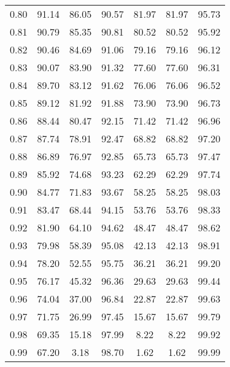 \begin{tabular}{|c|c|c|c|c|c|c|}
      0.80 &     91.14 &     86.05 &      90.57 &   81.97 &      81.97 &         95.73 \\
      0.81 &     90.79 &     85.35 &      90.81 &   80.52 &      80.52 &         95.92 \\
      0.82 &     90.46 &     84.69 &      91.06 &   79.16 &      79.16 &         96.12 \\
      0.83 &     90.07 &     83.90 &      91.32 &   77.60 &      77.60 &         96.31 \\
      0.84 &     89.70 &     83.12 &      91.62 &   76.06 &      76.06 &         96.52 \\
      0.85 &     89.12 &     81.92 &      91.88 &   73.90 &      73.90 &         96.73 \\
      0.86 &     88.44 &     80.47 &      92.15 &   71.42 &      71.42 &         96.96 \\
      0.87 &     87.74 &     78.91 &      92.47 &   68.82 &      68.82 &         97.20 \\
      0.88 &     86.89 &     76.97 &      92.85 &   65.73 &      65.73 &         97.47 \\
      0.89 &     85.92 &     74.68 &      93.23 &   62.29 &      62.29 &         97.74 \\
      0.90 &     84.77 &     71.83 &      93.67 &   58.25 &      58.25 &         98.03 \\
      0.91 &     83.47 &     68.44 &      94.15 &   53.76 &      53.76 &         98.33 \\
      0.92 &     81.90 &     64.10 &      94.62 &   48.47 &      48.47 &         98.62 \\
      0.93 &     79.98 &     58.39 &      95.08 &   42.13 &      42.13 &         98.91 \\
      0.94 &     78.20 &     52.55 &      95.75 &   36.21 &      36.21 &         99.20 \\
      0.95 &     76.17 &     45.32 &      96.36 &   29.63 &      29.63 &         99.44 \\
      0.96 &     74.04 &     37.00 &      96.84 &   22.87 &      22.87 &         99.63 \\
      0.97 &     71.75 &     26.99 &      97.45 &   15.67 &      15.67 &         99.79 \\
      0.98 &     69.35 &     15.18 &      97.99 &    8.22 &       8.22 &         99.92 \\
      0.99 &     67.20 &      3.18 &      98.70 &    1.62 &       1.62 &         99.99 \\
\bottomrule
\end{tabular}
